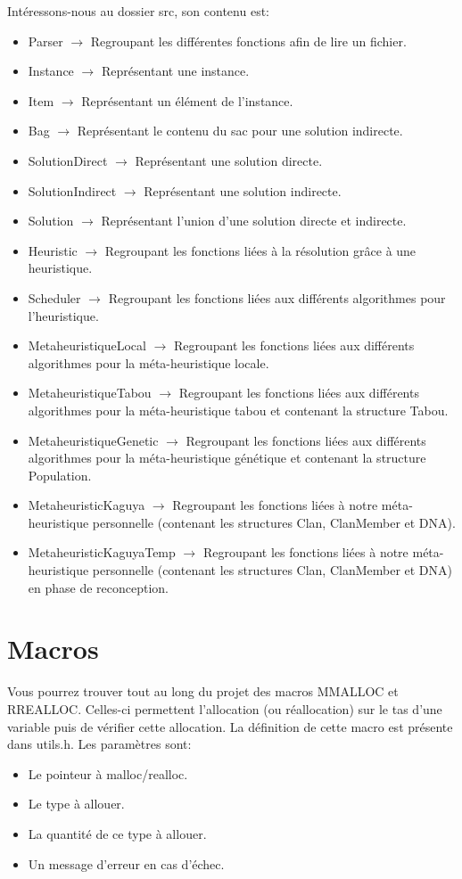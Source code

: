 \documentclass{EPUProjetPeiP}
\begin{document}
Intéressons-nous au dossier src, son contenu est:
\begin{itemize}
	\item Parser $\longrightarrow$ Regroupant les différentes fonctions afin de lire un fichier.
	\item Instance $\longrightarrow$ Représentant une instance.
	\item Item $\longrightarrow$ Représentant un élément de l'instance.
	\item Bag $\longrightarrow$ Représentant le contenu du sac pour une solution indirecte.
	\item SolutionDirect $\longrightarrow$ Représentant une solution directe.
	\item SolutionIndirect $\longrightarrow$ Représentant une solution indirecte.
	\item Solution $\longrightarrow$ Représentant l'union d'une solution directe et indirecte.
	\item Heuristic $\longrightarrow$ Regroupant les fonctions liées à la résolution grâce à une heuristique.
	\item Scheduler $\longrightarrow$ Regroupant les fonctions liées aux différents algorithmes pour l'heuristique.
	\item MetaheuristiqueLocal $\longrightarrow$ Regroupant les fonctions liées aux différents algorithmes pour la méta-heuristique locale.
	\item MetaheuristiqueTabou $\longrightarrow$ Regroupant les fonctions liées aux différents algorithmes pour la méta-heuristique tabou et contenant la structure Tabou.
	\item MetaheuristiqueGenetic $\longrightarrow$ Regroupant les fonctions liées aux différents algorithmes pour la méta-heuristique génétique et contenant la structure Population.
	\item MetaheuristicKaguya $\longrightarrow$ Regroupant les fonctions liées à notre méta-heuristique personnelle (contenant les structures Clan, ClanMember et DNA).
	\item MetaheuristicKaguyaTemp $\longrightarrow$ Regroupant les fonctions liées à notre méta-heuristique personnelle (contenant les structures Clan, ClanMember et DNA) en phase de reconception.
\end{itemize}

\section{Macros}
Vous pourrez trouver tout au long du projet des macros MMALLOC et RREALLOC. Celles-ci permettent l'allocation (ou réallocation) sur le tas d'une variable puis de vérifier cette allocation. La définition de cette macro est présente dans utils.h. Les paramètres sont:
	\begin{itemize}
		\item Le pointeur à malloc/realloc.
		\item Le type à allouer.
		\item La quantité de ce type à allouer.
		\item Un message d'erreur en cas d'échec.
	\end{itemize}
\end{document}
